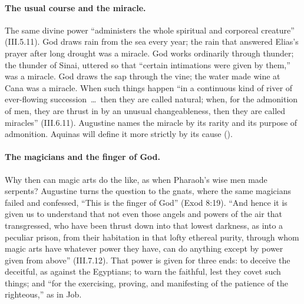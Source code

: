 \paragraph{The usual course and the miracle.} The same divine power
``administers the whole spiritual and corporeal creature'' (III.5.11). God
draws rain from the sea every year; the rain that answered Elias's prayer
after long drought was a miracle. God works ordinarily through thunder;
the thunder of Sinai, uttered so that ``certain intimations were given by
them,'' was a miracle. God draws the sap through the vine; the water made
wine at Cana was a miracle. When such things happen ``in a continuous kind
of river of ever-flowing succession~\dots\ then they are called natural;
when, for the admonition of men, they are thrust in by an unusual
changeableness, then they are called miracles'' (III.6.11). Augustine names
the miracle by its rarity and its purpose of admonition. Aquinas will
define it more strictly by its cause ().

\paragraph{The magicians and the finger of God.} Why then can magic arts do
the like, as when Pharaoh's wise men made serpents? Augustine turns the
question to the gnats, where the same magicians failed and confessed,
``This is the finger of God'' (Exod 8:19). ``And hence it is given us to
understand that not even those angels and powers of the air that
transgressed, who have been thrust down into that lowest darkness, as into
a peculiar prison, from their habitation in that lofty ethereal purity,
through whom magic arts have whatever power they have, can do anything
except by power given from above'' (III.7.12). That power is given for
three ends: to deceive the deceitful, as against the Egyptians; to warn the
faithful, lest they covet such things; and ``for the exercising, proving,
and manifesting of the patience of the righteous,'' as in Job.

